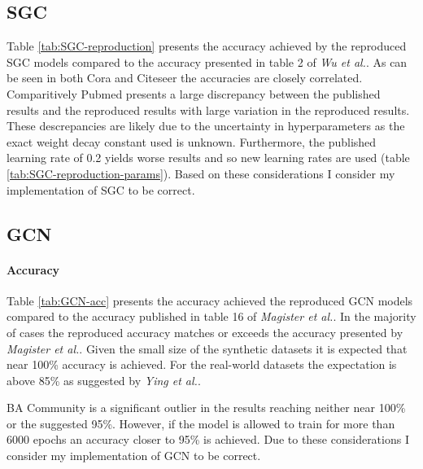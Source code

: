 \subsection{SGC}


Table \ref{tab:SGC-reproduction} presents the accuracy achieved by the reproduced SGC models compared to the accuracy presented in table 2 of \textit{Wu et al.}\cite{wu2019simplifying}.
As can be seen in both Cora and Citeseer the accuracies are closely correlated.
Comparitively Pubmed presents a large discrepancy between the published results and the reproduced results with large variation in the reproduced results.
These descrepancies are likely due to the uncertainty in hyperparameters as the exact weight decay constant used is unknown.
Furthermore, the published learning rate of 0.2 yields worse results and so new learning rates are used (table \ref{tab:SGC-reproduction-params}).
Based on these considerations I consider my implementation of SGC to be correct.

\subsection{GCN}
\label{sec:GCN-reproduction}
\paragraph{Accuracy}

Table \ref{tab:GCN-acc} presents the accuracy achieved the reproduced GCN models compared to the accuracy published in table 16 of \textit{Magister et al.}\cite{magister2021gcexplainer}.
In the majority of cases the reproduced accuracy matches or exceeds the accuracy presented by \textit{Magister et al.}.
Given the small size of the synthetic datasets it is expected that near 100\% accuracy is achieved.
For the real-world datasets the expectation is above 85\% as suggested by \textit{Ying et al.}\cite{ying2019gnnexplainer}.

BA Community is a significant outlier in the results reaching neither near 100\% or the suggested 95\%.
However, if the model is allowed to train for more than 6000 epochs an accuracy closer to 95\% is achieved.
Due to these considerations I consider my implementation of GCN to be correct.

